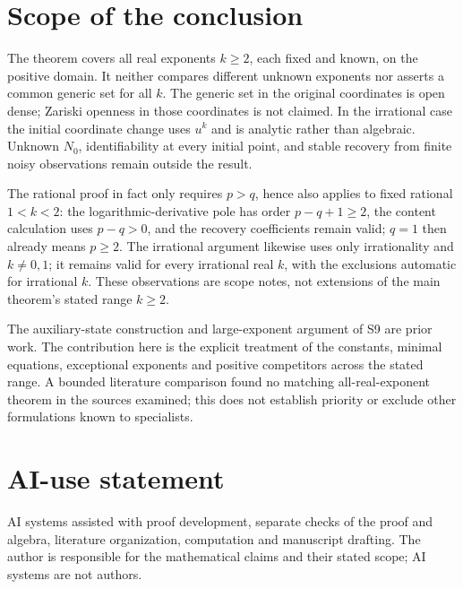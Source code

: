 \documentclass[10pt,a4paper]{article}
\theoremstyle{definition}\newtheorem{definition}[theorem]{Definition}
\begin{document}
\section{Scope of the conclusion}
\label{sec:scope}
The theorem covers all real exponents $k\geq2$, each fixed and known,
on the positive domain. It neither compares different unknown
exponents nor asserts a common generic set for all $k$. The generic
set in the original coordinates is open dense; Zariski openness in
those coordinates is not claimed. In the irrational case the initial
coordinate change uses $u^k$ and is analytic rather than algebraic.
Unknown $N_0$, identifiability at every initial point, and stable
recovery from finite noisy observations remain outside the result.

The rational proof in fact only requires $p>q$, hence also applies
to fixed rational $1<k<2$: the logarithmic-derivative pole has order
$p-q+1\geq2$, the content calculation uses $p-q>0$, and the recovery
coefficients remain valid; $q=1$ then already means $p\geq2$.
The irrational argument likewise uses only irrationality and
$k\ne0,1$; it remains valid for every irrational real $k$, with the
exclusions automatic for irrational $k$. These observations are scope
notes, not extensions of the main theorem's stated range $k\geq2$.

The auxiliary-state construction and large-exponent argument of S9
are prior work. The contribution here is the explicit treatment of
the constants, minimal equations, exceptional exponents and positive
competitors across the stated range. A bounded literature comparison
found no matching all-real-exponent theorem in the sources examined;
this does not establish priority or exclude other formulations known
to specialists.
\section*{AI-use statement}
AI systems assisted with proof development, separate checks of the
proof and algebra, literature organization, computation and manuscript
drafting. The author is responsible for the mathematical claims and
their stated scope; AI systems are not authors.
\end{document}
